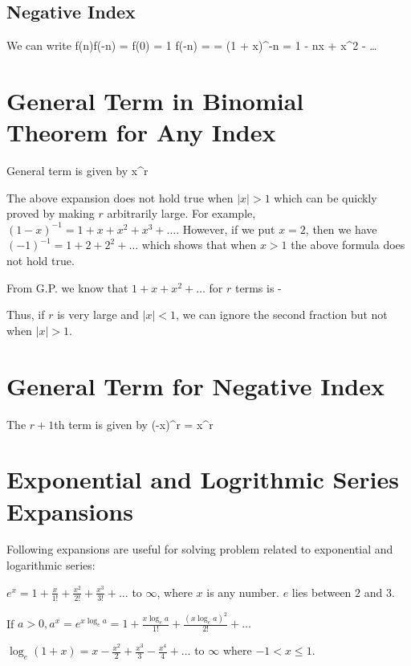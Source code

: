 \subsection{Negative Index}
We can write \startformula f(n)f(-n) = f(0) = 1\stopformula
\startformula \Rightarrow f(-n) =  = (1 + x)^{-n} = 1 - nx + x^2 - \ldots\stopformula

\section{General Term in Binomial Theorem for Any Index}
General term is given by \startformula {}x^r\stopformula

The above expansion does not hold true when $|x| > 1$ which can be quickly proved by making $r$ arbitrarily large. For example, $(1
- x)^{-1} = 1 + x + x^2 + x^3 + \ldots$. However, if we put $x = 2$, then we have $(-1)^{-1} = 1 + 2 + 2^2 + \ldots$ which shows
that when $x > 1$ the above formula does not hold true.

From G.P. we know that $1 + x + x^2 + \ldots$ for $r$ terms is \startformula {} - \stopformula

Thus, if $r$ is very large and $|x| < 1$, we can ignore the second fraction but not when $|x| > 1$.

\section{General Term for Negative Index}
The $r + 1$th term is given by \startformula {}(-x)^r\stopformula
\startformula = x^r\stopformula

\section{Exponential and Logrithmic Series Expansions}
Following expansions are useful for solving problem related to exponential and logarithmic series:
\startitemize[n]
\item $e^x = 1 + \frac{x}{1!} + \frac{x^2}{2!} + \frac{x^3}{3!} + \ldots$ to $\infty$, where $x$ is any number. $e$ lies between
  $2$ and $3$.
\item If $a > 0, a^x = e^{x\log_ea} = 1 + \frac{x\log_ea}{1!} + \frac{(x\log_ea)^2}{2!} + \ldots$
\item $\log_e(1 + x) = x - \frac{x^2}{2} + \frac{x^3}{3} - \frac{x^4}{4} + \ldots$ to $\infty$ where $-1< x\leq 1$.
\stopitemize

